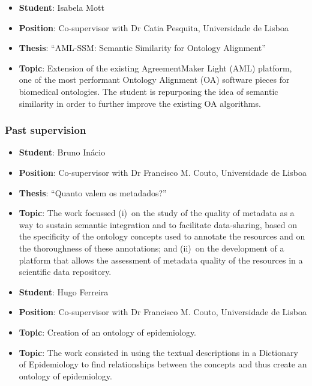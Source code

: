 \begin{itemize}
    \item \textbf{Student}: Isabela Mott
    \item \textbf{Position}: Co-supervisor with Dr Catia Pesquita, Universidade de Lisboa
    \item \textbf{Thesis}: ``AML-SSM: Semantic Similarity for Ontology Alignment''
    \item \textbf{Topic}: Extension of the existing AgreementMaker Light (AML) platform, one of the most performant Ontology Alignment (OA) software pieces for biomedical ontologies. The student is repurposing the idea of semantic similarity in order to further improve the existing OA algorithms.
\end{itemize}


\subsubsection{Past supervision}

\begin{itemize}
    \item \textbf{Student}: Bruno Inácio
    \item \textbf{Position}: Co-supervisor with Dr Francisco M. Couto, Universidade de Lisboa
    \item \textbf{Thesis}: ``Quanto valem os metadados?''
    \item \textbf{Topic}: The work focussed (i)~on the study of the quality of metadata as a way to sustain semantic integration and to facilitate data-sharing, based on the specificity of the ontology concepts used to annotate the resources and on the thoroughness of these annotations; and (ii)~on the development of a platform that allows the assessment of metadata quality of the resources in a scientific data repository.
\end{itemize}


\begin{itemize}
    \item \textbf{Student}: Hugo Ferreira
    \item \textbf{Position}: Co-supervisor with Dr Francisco M. Couto, Universidade de Lisboa
    \item \textbf{Topic}: Creation of an ontology of epidemiology.
    \item \textbf{Topic}: The work consisted in using the textual descriptions in a Dictionary of Epidemiology to find relationships between the concepts and thus create an ontology of epidemiology.
\end{itemize}


